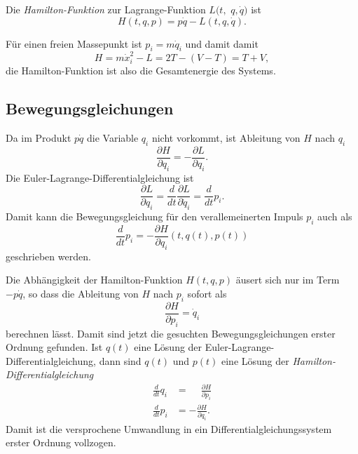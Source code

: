\begin{definition}
Die {\em Hamilton-Funktion} zur Lagrange-Funktion $L(t,$ $q,\dot{q})$ ist
\[
H(t,q,p)
=
p\dot{q}
-
L(t,q,\dot{q}).
\]
\end{definition}

Für einen freien Massepunkt ist $p_i = m\dot{q}_i$ und damit damit
\[
H=
m\dot{x}_i^2
-
L
=
2T
-
(V-T)
=
T+V,
\]
die Hamilton-Funktion ist also die Gesamtenergie des Systems.

%
%
\subsection{Bewegungsgleichungen}
Da im Produkt $p\dot{q}$ die Variable $q_i$ nicht vorkommt, ist
Ableitung von $H$ nach $q_i$
\[
\frac{\partial H}{\partial q_i}
=
-
\frac{\partial L}{\partial q_i}.
\]
Die Euler-Lagrange-Differentialgleichung ist
\[
\frac{\partial L}{\partial q_i}
=
\frac{d}{dt}\frac{\partial L}{\partial \dot{q}_i}
=
\frac{d}{dt} p_i.
\]
Damit kann die Bewegungsgleichung für den verallemeinerten Impuls $p_i$ auch als
\[
\frac{d}{dt}p_i
=
-
\frac{\partial H}{\partial q_i}(t,q(t),p(t))
\]
geschrieben werden.

Die Abhängigkeit der Hamilton-Funktion $H(t,q,p)$ äusert sich nur im Term
$-p\dot{q}$, so dass die Ableitung von $H$ nach $p_i$ sofort als
\[
\frac{\partial H}{\partial p_i}
=
\dot{q}_i
\]
berechnen lässt.
Damit sind jetzt die gesuchten Bewegungsgleichungen erster Ordnung gefunden.
Ist $q(t)$ eine Lösung der Euler-Lagrange-Differentialgleichung, dann sind
$q(t)$ und $p(t)$ eine Lösung der {\em Hamilton-Differentialgleichung}
\begin{align*}
\frac{d}{dt} q_i
&=
\phantom{-}\frac{\partial H}{\partial p_i}
\\
\frac{d}{dt} p_i
&=
-
\frac{\partial H}{\partial q_i}.
\end{align*}
Damit ist die versprochene Umwandlung in ein Differentialgleichungssystem
erster Ordnung vollzogen.


